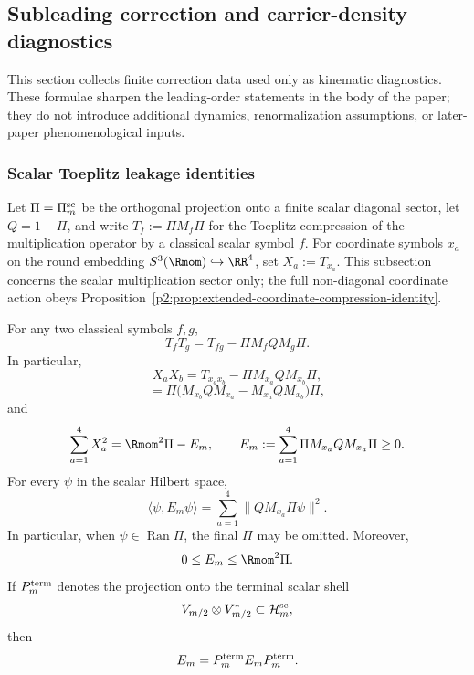 \documentclass[11pt,a4paper]{article}
\begin{document}
\subsection{Subleading correction and carrier-density diagnostics}
\label{p2:app:subleading-correction-diagnostics}

This section collects finite correction data used only as kinematic diagnostics.  These formulae sharpen the leading-order statements in the body of the paper; they do not introduce additional dynamics, renormalization assumptions, or later-paper phenomenological inputs.

\subsubsection{Scalar Toeplitz leakage identities}
\label{p2:app:toeplitz-leakage-identities}

Let \(\Pi=\Pi_m^{\rm sc}\) be the orthogonal projection onto a finite scalar diagonal sector, let \(Q=1-\Pi\), and write \(T_f:=\Pi M_f\Pi\) for the Toeplitz compression of the multiplication operator by a classical scalar symbol \(f\).  For coordinate symbols \(x_a\) on the round embedding \(S^3(\Rmom)\hookrightarrow\RR^4\), set \(X_a:=T_{x_a}\).  This subsection concerns the scalar multiplication sector only; the full non-diagonal coordinate action obeys Proposition~\ref{p2:prop:extended-coordinate-compression-identity}.

\begin{proposition}
\label{p2:prop:toeplitz-leakage-identities}
For any two classical symbols \(f,g\),
\begin{equation}
T_fT_g=T_{fg}-\Pi M_fQM_g\Pi .
\end{equation}
In particular,
\begin{equation}
X_aX_b=T_{x_ax_b}-\Pi M_{x_a}QM_{x_b}\Pi,
\end{equation}
\begin{equation}
[X_a,X_b]
=\Pi\bigl(M_{x_b}QM_{x_a}-M_{x_a}QM_{x_b}\bigr)\Pi,
\end{equation}
and
\begin{equation}
\sum_{a=1}^4X_a^2=\Rmom^2\Pi-E_m,
\qquad
E_m:=\sum_{a=1}^4\Pi M_{x_a}QM_{x_a}\Pi\ge0.
\end{equation}
For every \(\psi\) in the scalar Hilbert space,
\begin{equation}
\langle\psi,E_m\psi\rangle
=
\sum_{a=1}^4\|QM_{x_a}\Pi\psi\|^2.
\end{equation}
In particular, when \(\psi\in\operatorname{Ran}\Pi\), the final \(\Pi\) may
be omitted.  Moreover,
\begin{equation}
        0\le E_m\le\Rmom^2\Pi.
\end{equation}
If \(P_m^{\rm term}\) denotes the projection onto the terminal scalar shell
\[
V_{m/2}\otimes V_{m/2}^*
\subset\mathcal H_m^{\rm sc},
\]
then
\begin{equation}
        E_m=P_m^{\rm term}E_mP_m^{\rm term}.
\end{equation}
\end{proposition}
\end{document}
